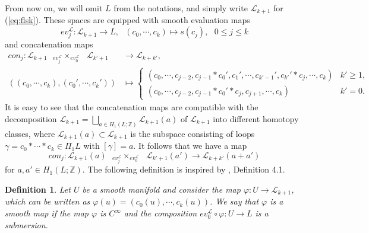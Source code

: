 \documentclass[a4paper]{article}
\newtheorem{definition}[theorem]{Definition}
\numberwithin{equation}{section}
\begin{document}
From now on, we will omit $L$ from the notations, and simply write $\mathcal{L}_{k+1}$ for (\ref{eq:flsk}). These spaces are equipped with smooth evaluation maps
\begin{equation}
\mathit{ev}_j^\mathcal{L}:\mathcal{L}_{k+1}\rightarrow L,\textrm{ }(c_0,\cdots,c_k)\mapsto s(c_j),\textrm{ }0\leq j\leq k
\end{equation}
and concatenation maps
\begin{equation}\label{eq:con}
\begin{split}
\mathit{con}_j:\mathcal{L}_{k+1}\textrm{ }{{}_{\mathit{ev}_j^\mathcal{L}}\times_{\mathit{ev}_0^\mathcal{L}}}\textrm{ }\mathcal{L}_{k'+1}&\rightarrow\mathcal{L}_{k+k'}, \\
\left((c_0,\cdots,c_k),(c_0',\cdots,c_k')\right)&\mapsto\left\{\begin{array}{ll}
(c_0,\cdots,c_{j-2},c_{j-1}\ast c_0',c_1',\cdots,c_{k'-1}',c_{k'}'\ast c_j,\cdots,c_k) & k'\geq1, \\
(c_0,\cdots,c_{j-2},c_{j-1}\ast c_0'\ast c_j,c_{j+1},\cdots,c_k) & k'=0.
\end{array}\right.
\end{split}
\end{equation}
It is easy to see that the concatenation maps are compatible with the decomposition $\mathcal{L}_{k+1}=\bigsqcup_{a\in H_1(L;\mathbb{Z})}\mathcal{L}_{k+1}(a)$ of $\mathcal{L}_{k+1}$ into different homotopy classes, where $\mathcal{L}_{k+1}(a)\subset\mathcal{L}_{k+1}$ is the subspace consisting of loops $\gamma=c_0\ast\cdots\ast c_k\in\Pi_1L$ with $[\gamma]=a$. It follows that we have a map
\begin{equation}\label{eq:conca}
\mathit{con}_j:\mathcal{L}_{k+1}(a)\textrm{ }{{}_{\mathit{ev}_j^\mathcal{L}}\times_{\mathit{ev}_0^\mathcal{L}}}\textrm{ }\mathcal{L}_{k'+1}(a')\rightarrow\mathcal{L}_{k+k'}(a+a')
\end{equation}
for $a,a'\in H_1(L;\mathbb{Z})$. The following definition is inspired by \cite{ki2}, Definition 4.1.

\begin{definition}\label{definition:smooth}
Let $U$ be a smooth manifold and consider the map $\varphi:U\rightarrow\mathcal{L}_{k+1}$, which can be written as $\varphi(u)=\left(c_0(u),\cdots,c_k(u)\right)$. We say that $\varphi$ is a smooth map if the map $\varphi$ is $C^\infty$ and the composition $\mathit{ev}_0^\mathcal{L}\circ\varphi:U\rightarrow L$ is a submersion.
\end{definition}
\end{document}

